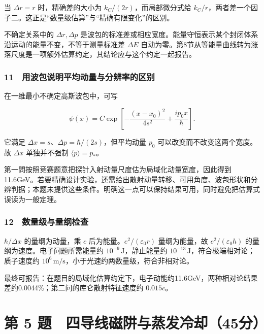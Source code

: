 \documentclass[12pt,a4paper,fontset=fandol]{ctexart}
\begin{document}
当 \(\Delta r=r\) 时，精确差的大小为 \(k_C/(2r)\)，而局部微分式给
\(k_C/r\)，两者差一个因子二。这正是``数量级估算''与``精确有限变化''的区别。

不确定关系中的 \(\Delta r,\Delta p\)
是波包的标准差或相应宽度。能量守恒表示某个封闭体系沿运动的能量不变，不等于测量标准差
\(\Delta E\)
自动为零。第8节从等能量曲线转为涨落尺度是一项额外估算约定，其结论应与这个约定一起报告。

\subsubsection{11　用波包说明平均动量与分辨率的区别}\label{ux7528ux6ce2ux5305ux8bf4ux660eux5e73ux5747ux52a8ux91cfux4e0eux5206ux8fa8ux7387ux7684ux533aux522b}

在一维最小不确定高斯波包中，可写

\[\psi(x)=C\exp\left[-\frac{(x-x_0)^2}{4s^2}
+\frac{i p_0x}{\hbar}\right].\]

它满足 \(\Delta x=s\)、\(\Delta p=\hbar/(2s)\)，但平均动量 \(p_0\)
可以改变而不改变这两个宽度。故 \(\Delta x\) 单独并不强制
\(\langle p\rangle=p_*\)。

第一問按照竞赛题意把探针入射动量尺度估为局域化动量宽度，因此得到11.6GeV。若要精确设计实验，还需给出散射动量转移、可用角度、波包形状和分辨判据；本题未提供这些条件。明确这一点可以保持结果可用，同时避免把估算式误读为一般定理。

\subsubsection{12　数量级与量纲检查}\label{ux6570ux91cfux7ea7ux4e0eux91cfux7eb2ux68c0ux67e5}

\(\hbar/\Delta x\) 的量纲为动量，乘 \(c\)
后为能量。\(e^2/(\varepsilon_0r)\) 量纲为能量，故
\(e^2/(\varepsilon_0h)\) 的量纲为速度。电子问题所需能量约
\(10^{-9}\,\mathrm J\)，静止能量约
\(10^{-13}\,\mathrm J\)，符合极端相对论；质子速度约
\(10^6\,\mathrm{m/s}\)，小于光速约两数量级，符合非相对论。

最终可报告：在题目的局域化估算约定下，电子动能约11.6GeV，两种相对论结果差约0.0044\%；第二问的库仑散射特征速度约
\(0.015c\)。

\clearpage

\section{第 5
题　四导线磁阱与蒸发冷却（45分）}\label{ux7b2c-5-ux9898-ux56dbux5bfcux7ebfux78c1ux9631ux4e0eux84b8ux53d1ux51b7ux537445ux5206}
\end{document}
